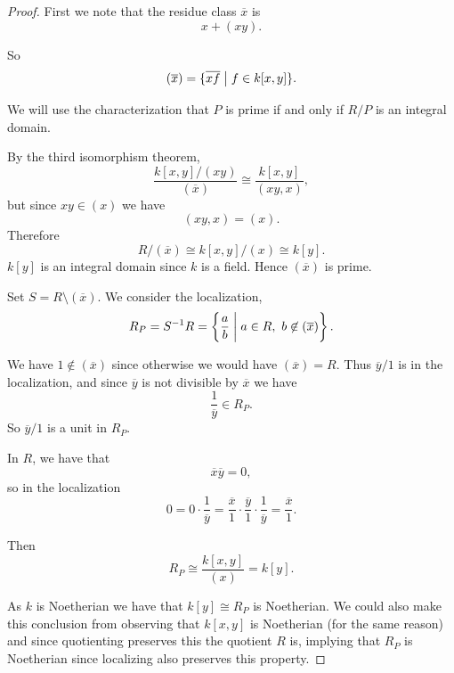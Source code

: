 \documentclass[11pt]{article}
\begin{document}
\begin{proof}
    First we note that the residue 
    class $\overline x$ is
    \[
        x + (xy). 
    \]

    So 
    \[
        (\overline x) 
        = \{\overline{xf} \bigm| f \in k[x,y]\}. 
    \]

    We will use the characterization that 
    $P$ is prime if and only if $R/P$ is an integral domain. 

    By the third isomorphism theorem, 
    \[
        \frac{k[x,y]/(xy)}{(\overline x)} 
        \cong \frac{k[x,y]}{(xy,x)}, 
    \]
    but since $xy \in (x)$ we have 
    \[
        (xy,x) = (x). 
    \]
    Therefore 
    \[  
        R/(\overline x) \cong k[x,y]/(x) 
        \cong k[y]. 
    \] 
    $k[y]$ is an integral domain since $k$ is a field. 
    Hence $(\overline x)$ is prime. 

    Set $S = R \setminus (\overline x)$. We 
    consider the localization, 
    \[
        R_P = S^{-1}R = \left\{\frac{a}{b} \biggm| 
        a \in R, \ b \not\in (\overline x)\right\}. 
    \]

    We have $1 \not\in (\overline x)$ since otherwise we 
    would have $(\overline x) = R$. Thus 
    $\overline y/1$ is in the localization, and since 
    $\overline y$ is not divisible by $\overline x$ 
    we have 
    \[
        \frac{1}{\overline y} \in R_P. 
    \]  
    So $\overline y/1$ is a unit in $R_P$. 

    In $R$, we have that 
    \[
        \overline x \overline y = 0, 
    \]
    so in the localization 
    \[
        0 = 0 \cdot \frac{1}{\overline y} = 
        \frac{\overline x}1 \cdot \frac{\overline y}1  
        \cdot \frac{1}{\overline y} = 
        \frac{\overline x}1. 
    \]
    
    Then 
    \[
        R_P \cong \frac{k[x,y]}{(x)} = k[y]. 
    \]


    As $k$ is Noetherian we have that 
    $k[y] \cong R_P$ is Noetherian. 
    We could also make this conclusion from observing 
    that $k[x,y]$ is Noetherian (for the same reason) 
    and since quotienting preserves this the 
    quotient $R$ is, implying that $R_P$ is Noetherian 
    since localizing also preserves this property.
\end{proof}
\end{document}

